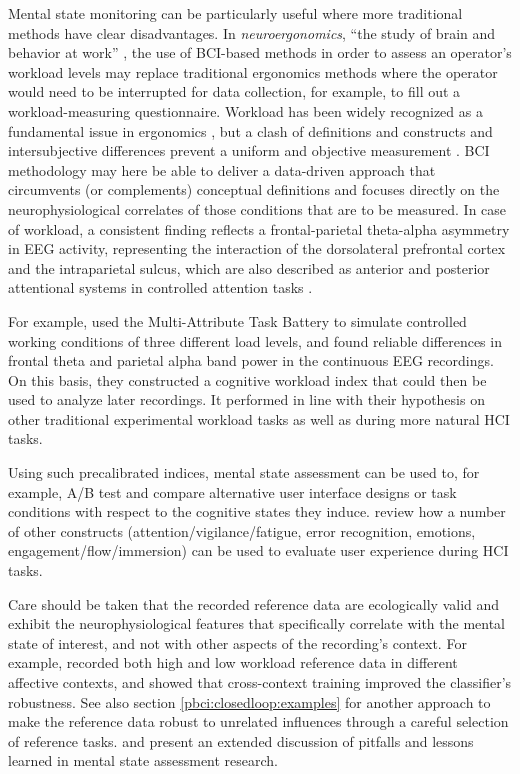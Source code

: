 Mental state monitoring can be particularly useful where more traditional methods have clear disadvantages. In \emph{neuroergonomics}, ``the study of brain and behavior at work'' \cite{parasuraman2003neuroergonomics}, the use of BCI-based methods in order to assess an operator's workload levels may replace traditional ergonomics methods where the operator would need to be interrupted for data collection, for example, to fill out a workload-measuring questionnaire. Workload has been widely recognized as a fundamental issue in ergonomics \cite{wickens2014engineeringpsychology}, but a clash of definitions and constructs and intersubjective differences prevent a uniform and objective measurement \cite{young2015workload}. BCI methodology may here be able to deliver a data-driven approach that circumvents (or complements) conceptual definitions and focuses directly on the neurophysiological correlates of those conditions that are to be measured. In case of workload, a consistent finding reflects a frontal-parietal theta-alpha asymmetry in EEG activity, representing the interaction of the dorsolateral prefrontal cortex and the intraparietal sulcus, which are also described as anterior and posterior attentional systems in controlled attention tasks \cite{gerjets2014workload}.

For example,  used the Multi-Attribute Task Battery \cite{comstock1992matb} to simulate controlled working conditions of three different load levels, and found reliable differences in frontal theta and parietal alpha band power in the continuous EEG recordings. On this basis, they constructed a cognitive workload index that could then be used to analyze later recordings. It performed in line with their hypothesis on other traditional experimental workload tasks as well as during more natural HCI tasks.

Using such precalibrated indices, mental state assessment can be used to, for example, A/B test and compare alternative user interface designs or task conditions with respect to the cognitive states they induce.  review how a number of other constructs (attention/vigilance/fatigue, error recognition, emotions, engagement/flow/immersion) can be used to evaluate user experience during HCI tasks.

Care should be taken that the recorded reference data are ecologically valid and exhibit the neurophysiological features that specifically correlate with the mental state of interest, and not with other aspects of the recording's context. For example, \cite{muhl2014crosscontextworkload} recorded both high and low workload reference data in different affective contexts, and showed that cross-context training improved the classifier's robustness. See also section \ref{pbci:closedloop:examples} for another approach to make the reference data robust to unrelated influences through a careful selection of reference tasks.  and  present an extended discussion of pitfalls and lessons learned in mental state assessment research.

